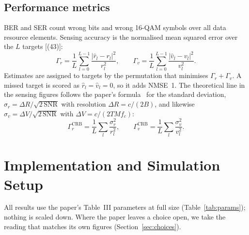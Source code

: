 \documentclass[11pt,a4paper]{article}
\begin{document}
\subsection{Performance metrics}\label{sec:metrics}
BER and SER count wrong bits and wrong 16-QAM symbols over all data resource elements. Sensing accuracy is the normalised mean squared error over the $L$ targets [(43)]:
\begin{equation}
  \Gamma_r=\frac{1}{L}\sum_{l=0}^{L-1}\frac{|\hat r_l-r_l|^2}{r_l^2},\qquad
  \Gamma_v=\frac{1}{L}\sum_{l=0}^{L-1}\frac{|\hat v_l-v_l|^2}{v_l^2}.
\label{eq:nmse}
\end{equation}
Estimates are assigned to targets by the permutation that minimises $\Gamma_r+\Gamma_v$. A missed target is scored as $\hat r_l=\hat v_l=0$, so it adds NMSE~1. The theoretical line in the sensing figures follows the paper's formula~\cite{isacnet} for the standard deviation, $\sigma_r=\Delta R/\sqrt{2\,\mathrm{SNR}}$ with resolution $\Delta R=c/(2B)$, and likewise $\sigma_v=\Delta V/\sqrt{2\,\mathrm{SNR}}$ with $\Delta V=c/(2TMf_c)$:
\begin{equation}
  \Gamma_r^{\mathrm{CRB}}=\frac{1}{L}\sum_{l}\frac{\sigma_r^2}{r_l^2},\qquad
  \Gamma_v^{\mathrm{CRB}}=\frac{1}{L}\sum_{l}\frac{\sigma_v^2}{v_l^2}.
\label{eq:crb}
\end{equation}

\section{Implementation and Simulation Setup}\label{sec:impl}
All results use the paper's Table~III parameters at full size (Table~\ref{tab:params}); nothing is scaled down. Where the paper leaves a choice open, we take the reading that matches its own figures (Section~\ref{sec:choices}).
\end{document}
